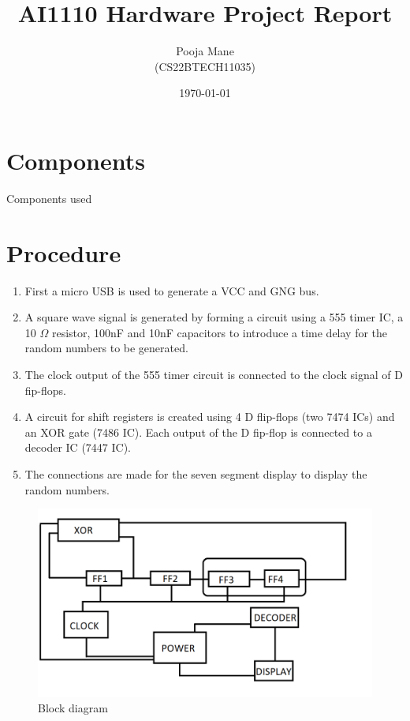 \documentclass[journal,12pt,twocolumn]{IEEEtran}
\title{AI1110 Hardware Project Report}
\author{Pooja Mane\\ (CS22BTECH11035)}
\date{\today}
\begin{document}
\maketitle

\section{Components}

\begin{table}[htbp]
\label{tab:1}

\caption{Components used}
\end{table}

\section{Procedure}
\begin{enumerate}
\item First a micro USB is used to generate a VCC and GNG bus.
\item A square wave signal is generated by forming a circuit using a 555 timer IC, a 10 $\Omega$ resistor, 100nF and 10nF capacitors to introduce a time delay for the random numbers to be generated.  
\item The clock output of the 555 timer circuit is connected to the clock signal of D fip-flops.
\item A circuit for shift registers is created using 4 D flip-flops (two 7474 ICs) and an XOR gate (7486 IC). Each output of the D fip-flop is connected to a decoder IC (7447 IC).
\item The connections are made for the seven segment display to display the random numbers.

\end{enumerate}

\begin{figure}
    \centering
    \includegraphics[width=\linewidth]{figs/diagram.png}
    \caption{Block diagram}
    \label{fig:my_label}
\end{figure}
\end{document}
